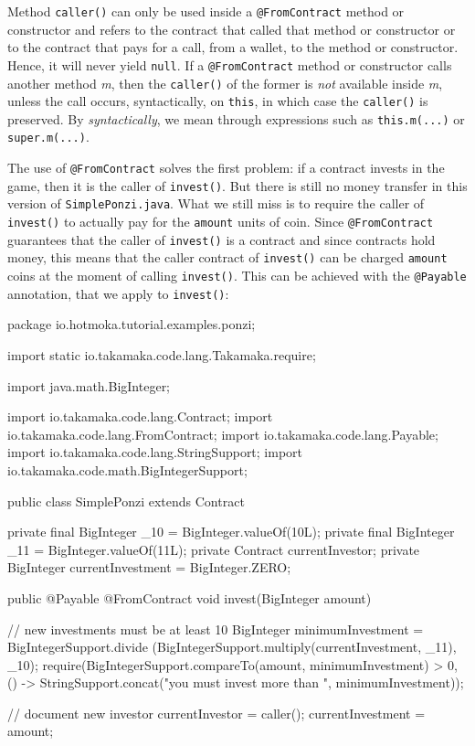 \begin{commentbox}
Method \texttt{caller()} can only be used inside a \texttt{@FromContract} method or
constructor and refers to the contract that called that method or constructor
or to the contract that pays for a call, from a wallet, to the method or constructor.
Hence, it will never yield \texttt{null}. If a \texttt{@FromContract} method or constructor
calls another method \emph{m}, then the \texttt{caller()} of the former is \emph{not} available
inside \emph{m}, unless the call occurs, syntactically, on \texttt{this}, in which case
the \texttt{caller()} is preserved. By \emph{syntactically}, we mean through expressions such as
\texttt{this.m(...)} or \texttt{super.m(...)}.
\end{commentbox}

The use of \texttt{@FromContract} solves the first problem: if a contract invests in the game,
then it is the caller of \texttt{invest()}. But there is still no money
transfer in this version of \texttt{SimplePonzi.java}. What we still miss is to require
the caller of \texttt{invest()} to actually pay for the \texttt{amount} units of coin.
Since \texttt{@FromContract} guarantees that the caller of \texttt{invest()} is a contract and since
contracts hold money, this means that the caller contract of \texttt{invest()}
can be charged \texttt{amount} coins at the moment of calling \texttt{invest()}.
This can be achieved with the \texttt{@Payable} annotation,
that we apply to \texttt{invest()}:
%
\begin{codebox}\begin{javalst}
package io.hotmoka.tutorial.examples.ponzi;

import static io.takamaka.code.lang.Takamaka.require;

import java.math.BigInteger;

import io.takamaka.code.lang.Contract;
import io.takamaka.code.lang.FromContract;
import io.takamaka.code.lang.Payable;
import io.takamaka.code.lang.StringSupport;
import io.takamaka.code.math.BigIntegerSupport;

public class SimplePonzi extends Contract {
  private final BigInteger _10 = BigInteger.valueOf(10L);
  private final BigInteger _11 = BigInteger.valueOf(11L);
  private Contract currentInvestor;
  private BigInteger currentInvestment = BigInteger.ZERO;

  public @Payable @FromContract void invest(BigInteger amount) {
    // new investments must be at least 10%
    BigInteger minimumInvestment = BigIntegerSupport.divide
      (BigIntegerSupport.multiply(currentInvestment, _11), _10);
    require(BigIntegerSupport.compareTo(amount, minimumInvestment) > 0,
      () -> StringSupport.concat("you must invest more than ", minimumInvestment));

    // document new investor
    currentInvestor = caller();
    currentInvestment = amount;
  }
}
\end{javalst}\end{codebox}
